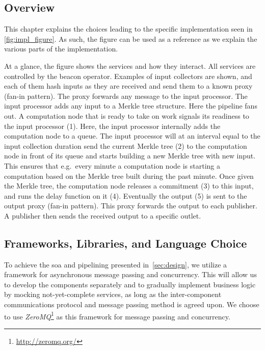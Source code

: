 \subsection{Overview}%
\label{sub:overview}
This chapter explains the choices leading to the specific implementation seen in \vref{fig:impl_figure}. As such, the figure can be used as a reference as we explain the various parts of the implementation.

At a glance, the figure shows the services and how they interact. All services are controlled by the beacon operator. Examples of input collectors are shown, and each of them hash inputs as they are received and send them to a known proxy (fan-in pattern). The proxy forwards any message to the input processor. The input processor adds any input to a Merkle tree structure. Here the pipeline fans out. A computation node that is ready to take on work signals its readiness to the input processor (1). Here, the input processor internally adds the computation node to a queue. The input processor will at an interval equal to the input collection duration send the current Merkle tree (2) to the computation node in front of its queue and starts building a new Merkle tree with new input. This ensures that e.g.\ every minute a computation node is starting a computation based on the Merkle tree built during the past minute. Once given the Merkle tree, the computation node releases a commitment (3) to this input, and runs the delay function on it (4). Eventually the output (5) is sent to the output proxy (fan-in pattern). This proxy forwards the output to each publisher. A publisher then sends the received output to a specific outlet.



\subsection{Frameworks, Libraries, and Language Choice}
To achieve the \acrfull{soa} and pipelining presented in~\cref{sec:design}, we utilize a framework for asynchronous message passing and concurrency.
This will allow us to develop the components separately and to gradually implement business logic by mocking not-yet-complete services, as long as the inter-component communications protocol and message passing method is agreed upon.
We choose to use \textit{ZeroMQ}\footnote{\url{http://zeromq.org/}} as this framework for message passing and concurrency.

